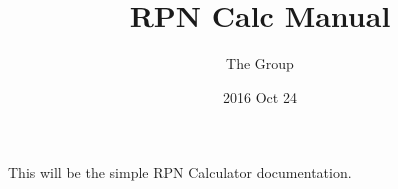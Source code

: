 \documentclass[12pt]{article}
\title{RPN Calc Manual}
\author{The Group}
\date{2016 Oct 24}
\begin{document}
\setlength{\parindent}{0em}

\maketitle

This will be the simple RPN Calculator documentation.
\end{document}
